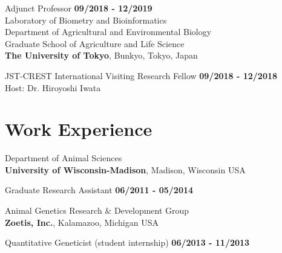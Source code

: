 \documentclass[margin,line,10pt]{res}
\newenvironment{list2}{
  \begin{list}{$\bullet$}{%
      \setlength{\itemsep}{0in}
      \setlength{\parsep}{0in} \setlength{\parskip}{0in}
      \setlength{\topsep}{0in} \setlength{\partopsep}{0in} 
      \setlength{\leftmargin}{0.2in}}}{\end{list}}
\begin{document}
\begin{resume}
Adjunct Professor  \hfill {\bf 09/2018 - 12/2019}\\ 



Laboratory of Biometry and Bioinformatics\\
Department of Agricultural and Environmental Biology \\
Graduate School of Agriculture and Life Science \\
{\bf The University of Tokyo}, Bunkyo, Tokyo, Japan
\vspace{-.35cm}

JST-CREST International Visiting Research Fellow  \hfill {\bf 09/2018 - 12/2018}\\
Host: Dr. Hiroyoshi Iwata


  


\vspace{0.4cm}
\section{\sc Work \phantom{1cm} Experience}
Department of Animal Sciences\\
{\bf University of Wisconsin-Madison}, Madison, Wisconsin USA
\vspace{-.35cm}

Graduate Research Assistant   \hfill {\bf 06/2011 - 05/2014}\\
\vspace{-.4cm}

Animal Genetics Research \& Development  Group \\
{\bf Zoetis, Inc.}, Kalamazoo, Michigan USA

\vspace{-.35cm}

Quantitative Geneticist (student internship)   \hfill {\bf 06/2013 - 11/2013}\\





\begin{comment}
\vspace{0.5cm}
\section{\sc Awards and Recognition}
\begin{list2}
  \item 
\end{list2}
\end{comment}




\end{resume}
\end{document}
